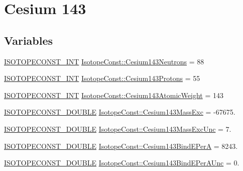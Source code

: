 \hypertarget{group___isotope_const-_cesium-_cs143}{}\section{Cesium 143}
\label{group___isotope_const-_cesium-_cs143}
\subsection*{Variables}
\begin{DoxyCompactItemize}
\item 
\mbox{\hyperlink{group___isotope_const-_macros_ga5f18360b3e99483a35c32d789e62621c}{I\+S\+O\+T\+O\+P\+E\+C\+O\+N\+S\+T\+\_\+\+I\+NT}} \mbox{\hyperlink{group___isotope_const-_cesium-_cs143_gabb2eb025ba882122110899f30e84b01c}{Isotope\+Const\+::\+Cesium143\+Neutrons}} = 88
\item 
\mbox{\hyperlink{group___isotope_const-_macros_ga5f18360b3e99483a35c32d789e62621c}{I\+S\+O\+T\+O\+P\+E\+C\+O\+N\+S\+T\+\_\+\+I\+NT}} \mbox{\hyperlink{group___isotope_const-_cesium-_cs143_ga94f5dd70b0698690be5e0bf46ea2dc48}{Isotope\+Const\+::\+Cesium143\+Protons}} = 55
\item 
\mbox{\hyperlink{group___isotope_const-_macros_ga5f18360b3e99483a35c32d789e62621c}{I\+S\+O\+T\+O\+P\+E\+C\+O\+N\+S\+T\+\_\+\+I\+NT}} \mbox{\hyperlink{group___isotope_const-_cesium-_cs143_ga3ebb16372d3cb30698ed1e18d8a92b48}{Isotope\+Const\+::\+Cesium143\+Atomic\+Weight}} = 143
\item 
\mbox{\hyperlink{group___isotope_const-_macros_ga8f45a7272ce02c0b4c65c44636ed719a}{I\+S\+O\+T\+O\+P\+E\+C\+O\+N\+S\+T\+\_\+\+D\+O\+U\+B\+LE}} \mbox{\hyperlink{group___isotope_const-_cesium-_cs143_gaeb2a9ac24d00b480e85deb94e2631e6d}{Isotope\+Const\+::\+Cesium143\+Mass\+Exc}} = -\/67675.
\item 
\mbox{\hyperlink{group___isotope_const-_macros_ga8f45a7272ce02c0b4c65c44636ed719a}{I\+S\+O\+T\+O\+P\+E\+C\+O\+N\+S\+T\+\_\+\+D\+O\+U\+B\+LE}} \mbox{\hyperlink{group___isotope_const-_cesium-_cs143_ga057aad899087ac341a224d6b2822dc8a}{Isotope\+Const\+::\+Cesium143\+Mass\+Exc\+Unc}} = 7.
\item 
\mbox{\hyperlink{group___isotope_const-_macros_ga8f45a7272ce02c0b4c65c44636ed719a}{I\+S\+O\+T\+O\+P\+E\+C\+O\+N\+S\+T\+\_\+\+D\+O\+U\+B\+LE}} \mbox{\hyperlink{group___isotope_const-_cesium-_cs143_gab631c9b3d4d547b65e93ad1ad61347c2}{Isotope\+Const\+::\+Cesium143\+Bind\+E\+PerA}} = 8243.
\item 
\mbox{\hyperlink{group___isotope_const-_macros_ga8f45a7272ce02c0b4c65c44636ed719a}{I\+S\+O\+T\+O\+P\+E\+C\+O\+N\+S\+T\+\_\+\+D\+O\+U\+B\+LE}} \mbox{\hyperlink{group___isotope_const-_cesium-_cs143_gaa026ba9915356dcff59d802601fadc64}{Isotope\+Const\+::\+Cesium143\+Bind\+E\+Per\+A\+Unc}} = 0.

\end{DoxyCompactItemize}
